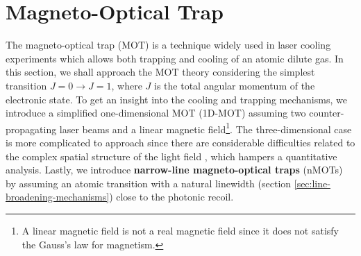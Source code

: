 %
\chapter{Magneto-Optical Trap}
\label{ch:MOT}
%

The magneto-optical trap (MOT) is a technique widely used in laser cooling experiments which allows both trapping and cooling of an atomic dilute gas. In this section, we shall approach the MOT theory \cite{krzysztof2010magneto, perrin2014doppler} considering the simplest transition $ J = 0 \rightarrow J = 1$, where $ J $ is the total angular momentum of the electronic state. To get an insight into the cooling and trapping mechanisms, we introduce a simplified one-dimensional MOT (1D-MOT) assuming two counter-propagating laser beams and a linear magnetic field\footnote{A linear magnetic field is not a real magnetic field since it does not satisfy the Gauss's law for magnetism.}. The three-dimensional case is more complicated to approach since there are considerable difficulties related to the complex spatial structure of the light field \cite{prudnikov2015three}, which hampers a quantitative analysis. Lastly, we introduce \textbf{narrow-line magneto-optical traps} (nMOTs) \cite{loftus2004narrow} by assuming an atomic transition with a natural linewidth (section \ref{sec:line-broadening-mechanisms}) close to the photonic recoil.


%


%


%
